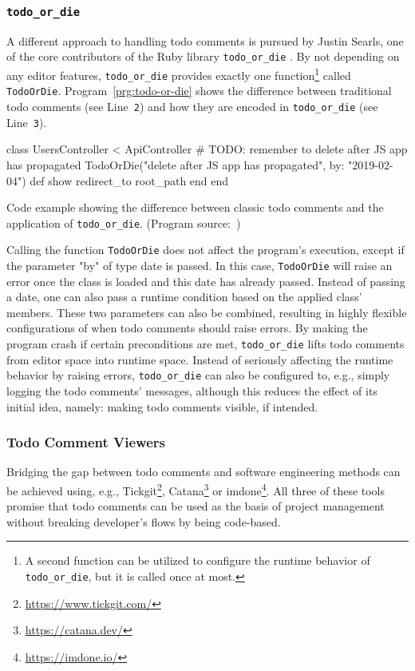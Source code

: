 \subsubsection{\texttt{todo\_or\_die}}
\label{sec:todo-or-die}
A different approach to handling todo comments is pursued by Justin Searls, one of the core contributors of the Ruby library \texttt{todo\_or\_die} \cite{searls_todo_2023}.
By not depending on any editor features, \texttt{todo\_or\_die} provides exactly one function\footnote{A second function can be utilized to configure the runtime behavior of \texttt{todo\_or\_die}, but it is called once at most.} called \texttt{TodoOrDie}.
Program~\ref{prg:todo-or-die} shows the difference between traditional todo comments (see Line~\verb|2|) and how they are encoded in \texttt{todo\_or\_die} (see Line~\verb|3|).
%
\begin{program}[ht]
\begin{PythonCode}
class UsersController < ApiController
  # TODO: remember to delete after JS app has propagated
  TodoOrDie("delete after JS app has propagated", by: "2019-02-04")
  def show
    redirect_to root_path
  end
end
\end{PythonCode}
\caption{Code example showing the difference between classic todo comments and the application of \texttt{todo\_or\_die}. (Program source:~\cite{searls_todo_2023})}
\label{prg:todo-or-die}
\end{program}
%
Calling the function \texttt{TodoOrDie} does not affect the program's execution, except if the parameter "by" of type date is passed.
In this case, \texttt{TodoOrDie} will raise an error once the class is loaded and this date has already passed.
Instead of passing a date, one can also pass a runtime condition based on the applied class' members.
These two parameters can also be combined, resulting in highly flexible configurations of when todo comments should raise errors.
By making the program crash if certain preconditions are met, \texttt{todo\_or\_die} lifts todo comments from editor space into runtime space.
Instead of seriously affecting the runtime behavior by raising errors, \texttt{todo\_or\_die} can also be configured to, e.g., simply logging the todo comments' messages, although this reduces the effect of its initial idea, namely: making todo comments visible, if intended.


\subsubsection{Todo Comment Viewers}
Bridging the gap between todo comments and software engineering methods can be achieved using, e.g., Tickgit\footnote{\url{https://www.tickgit.com/}}, Catana\footnote{\url{https://catana.dev/}} or imdone\footnote{\url{https://imdone.io/}}.
All three of these tools promise that todo comments can be used as the basis of project management without breaking developer's flows by being code-based.

